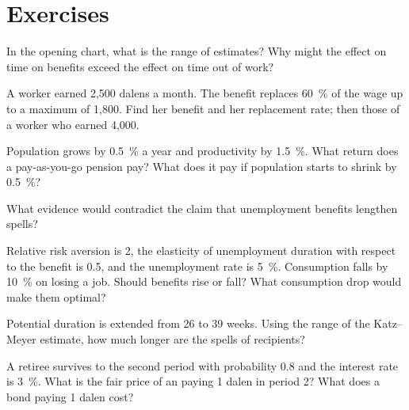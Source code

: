 \section{Exercises}\label{sec:b3:social-insurance:exercises}

\begin{exercise}[$\star$]\label{exo:b3:social-insurance:1}
In the opening chart, what is the range of estimates? Why might the effect on time
on benefits exceed the effect on time out of work?
\end{exercise}

\begin{exercise}[$\star$]\label{exo:b3:social-insurance:2}
A worker earned 2{,}500 dalens a month. The benefit replaces 60~\% of the wage up to a
maximum of 1{,}800. Find her benefit and her replacement rate; then those of a worker
who earned 4{,}000.
\end{exercise}

\begin{exercise}[$\star$]\label{exo:b3:social-insurance:3}
Population grows by 0.5~\% a year and productivity by 1.5~\%. What return does a
pay-as-you-go pension pay? What does it pay if population starts to shrink by 0.5~\%?
\end{exercise}

\begin{exercise}[$\star$]\label{exo:b3:social-insurance:4}
What evidence would contradict the claim that unemployment benefits lengthen spells?
\end{exercise}

\begin{exercise}[$\star\star$]\label{exo:b3:social-insurance:5}
Relative risk aversion is 2, the elasticity of unemployment duration with respect to
the benefit is 0.5, and the unemployment rate is 5~\%. Consumption falls by 10~\% on
losing a job. Should benefits rise or fall? What consumption drop would make them
optimal?
\end{exercise}

\begin{exercise}[$\star\star$]\label{exo:b3:social-insurance:6}
Potential duration is extended from 26 to 39 weeks. Using the range of the Katz--Meyer
estimate, how much longer are the spells of recipients?
\end{exercise}

\begin{exercise}[$\star\star$]\label{exo:b3:social-insurance:7}
A retiree survives to the second period with probability 0.8 and the interest rate is
3~\%. What is the fair price of an  paying 1 dalen in period 2? What does a bond
paying 1 dalen cost?
\end{exercise}

